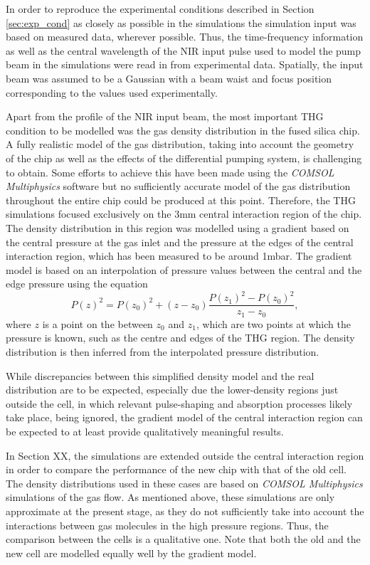 \documentclass[a4paper]{jpconf}
\begin{document}
In order to reproduce the experimental conditions described in Section \ref{sec:exp_cond} as closely as possible in the simulations the simulation input was based on measured data, wherever possible. Thus, the time-frequency information as well as the central wavelength of the NIR input pulse used to model the pump beam in the simulations were read in from experimental data. Spatially, the input beam was assumed to be a Gaussian with a beam waist and focus position corresponding to the values used experimentally. \par 
Apart from the profile of the NIR input beam, the most important THG condition to be modelled was the gas density distribution in the fused silica chip. A fully realistic model of the gas distribution, taking into account the geometry of the chip as well as the effects of the differential pumping system, is challenging to obtain. Some efforts to achieve this have been made using the \textit{COMSOL Multiphysics} software but no sufficiently accurate model of the gas distribution throughout the entire chip could be produced at this point. Therefore, the THG simulations focused exclusively on the 3mm central interaction region of the chip. The density distribution in this region was modelled using a gradient based on the central pressure at the gas inlet and the pressure at the edges of the central interaction region, which has been measured to be around 1mbar. The gradient model is based on an interpolation of pressure values between the central and the edge pressure using the equation 
\begin{equation}
P(z)^2 = P(z_0)^2 + (z-z_0) \frac{P(z_1)^2 - P(z_0)^2}{z_1 - z_0}, 
\end{equation}
where $z$ is a point on the between $z_0$ and $z_1$, which are two points at which the pressure is known, such as the centre and edges of the THG region. The density distribution is then inferred from the interpolated pressure distribution. \par 
While discrepancies between this simplified density model and the real distribution are to be expected, especially due the lower-density regions just outside the cell, in which relevant pulse-shaping and absorption processes likely take place, being ignored, the gradient model of the central interaction region can be expected to at least provide qualitatively meaningful results. \par 
In Section XX, the simulations are extended outside the central interaction region in order to compare the performance of the new chip with that of the old cell. The density distributions used in these cases are based on \textit{COMSOL Multiphysics} simulations of the gas flow. As mentioned above, these simulations are only approximate at the present stage, as they do not sufficiently take into account the interactions between gas molecules in the high pressure regions. Thus, the comparison between the cells is a qualitative one. Note that both the old and the new cell are modelled equally well by the gradient model. \par 
\end{document}
